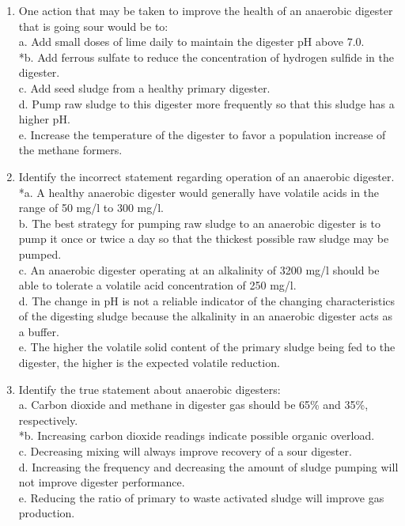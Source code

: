 \documentclass{article}
\begin{document}
\begin{enumerate}
\item  One action that may be taken to improve the health of an anaerobic digester that is going sour would be to: \\

a. Add small doses of lime daily to maintain the digester pH above 7.0. \\
*b. Add ferrous sulfate to reduce the concentration of hydrogen sulfide in the digester. \\
c. Add seed sludge from a healthy primary digester. \\
d. Pump raw sludge to this digester more frequently so that this sludge has a higher pH. \\
e. Increase the temperature of the digester to favor a population increase of the methane formers. \\

\item  Identify the incorrect statement regarding operation of an anaerobic digester. \\

*a. A healthy anaerobic digester would generally have volatile acids in the range of 50 mg/l to 300 mg/l. \\
b. The best strategy for pumping raw sludge to an anaerobic digester is to pump it once or twice a day so that the thickest possible raw sludge may be pumped. \\
c. An anaerobic digester operating at an alkalinity of 3200 mg/l should be able to tolerate a volatile acid concentration of 250 mg/l. \\
d. The change in pH is not a reliable indicator of the changing characteristics of the digesting sludge because the alkalinity in an anaerobic digester acts as a buffer. \\
e. The higher the volatile solid content of the primary sludge being fed to the digester, the higher is the expected volatile reduction. \\

\item  Identify the true statement about anaerobic digesters: \\

a. Carbon dioxide and methane in digester gas should be 65\% and 35\%, respectively. \\
*b. Increasing carbon dioxide readings indicate possible organic overload. \\
c. Decreasing mixing will always improve recovery of a sour digester. \\
d. Increasing the frequency and decreasing the amount of sludge pumping will not improve digester performance. \\
e. Reducing the ratio of primary to waste activated sludge will improve gas production. \\


\end{enumerate}
\end{document}
